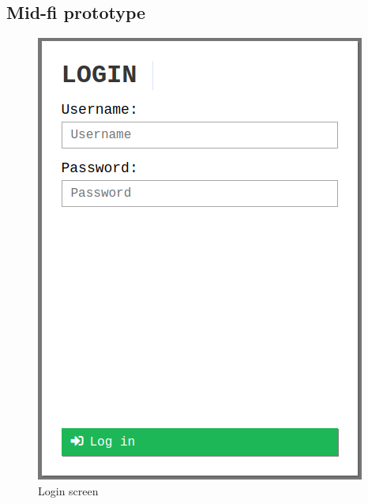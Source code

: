 \subsection{Mid-fi prototype}
\begin{table}[H]
    \begin{minipage}{.33\textwidth}
        \begin{figure}[H]
            \centering
            \includegraphics[width=0.95\linewidth]{InteraktionsDesign/Assets/Prototype/1.png}
            \caption{Login screen}
            \label{fig:prototype1}
        \end{figure}
    \end{minipage}
    \begin{minipage}{.33\textwidth}
        \begin{figure}[H]
            \centering

\end{figure}
\end{minipage}
\end{table}
